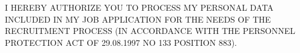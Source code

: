 \documentclass[11pt, a4paper]{awesome-cv}
\begin{document}
\makecvheader[L]

\makecvfooter
  {I HEREBY AUTHORIZE YOU TO PROCESS MY PERSONAL DATA INCLUDED IN MY JOB APPLICATION FOR THE NEEDS OF THE RECRUITMENT PROCESS (IN ACCORDANCE WITH THE PERSONNEL PROTECTION ACT OF 29.08.1997 NO 133 POSITION 883).}
  {}
  {}


% 
\vspace{-2.0mm}


%


%




\end{document}
